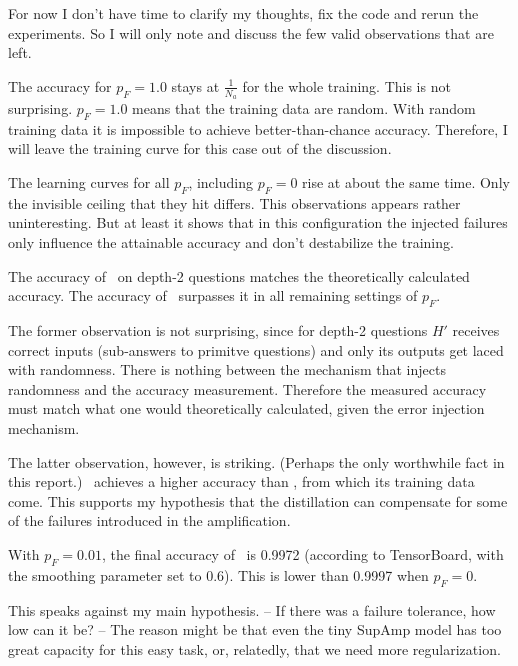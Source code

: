 \documentclass{farlamp}
\begin{document}
For now I don't have time to clarify my thoughts, fix the code and rerun the
experiments. So I will only note and discuss the few valid observations that are
left.

\Obs The accuracy for $p_F = 1.0$ stays at $\frac{1}{N_a}$ for the whole
training.
\Disc This is not surprising. $p_F = 1.0$ means that the training data are
random. With random training data it is impossible to achieve better-than-chance
accuracy. Therefore, I will leave the training curve for this case out of the
discussion.

\Obs The learning curves for all $p_F$, including $p_F = 0$ rise at about the
same time. Only the invisible ceiling that they hit differs.
\Disc This observations appears rather uninteresting. But at least it shows that
in this configuration the injected failures only influence the attainable
accuracy and don't destabilize the training.

\Obs The accuracy of \AmpHp\ on depth-2 questions matches the theoretically
calculated accuracy. The accuracy of \Xpa\ surpasses it in all remaining settings
of $p_F$.

\Disc The former observation is not surprising, since for depth-2 questions $H'$
receives correct inputs (sub-answers to primitve questions) and only its outputs
get laced with randomness. There is nothing between the mechanism that injects
randomness and the accuracy measurement. Therefore the measured accuracy must
match what one would theoretically calculated, given the error injection
mechanism.

The latter observation, however, is striking. (Perhaps the only worthwhile fact
in this report.) \Xpa\ achieves a higher accuracy than \AmpHp, from which its
training data come. This supports my hypothesis that the distillation can
compensate for some of the failures introduced in the amplification.


\Obs With $p_F = 0.01$, the final accuracy of \Xpa\ is 0.9972 (according to
TensorBoard, with the smoothing parameter set to 0.6). This is lower than 0.9997
when $p_F = 0$.

\Disc This speaks against my main hypothesis. – If there was a failure
tolerance, how low can it be? – The reason might be that even the tiny SupAmp
model has too great capacity for this easy task, or, relatedly, that we need
more regularization.
\end{document}
